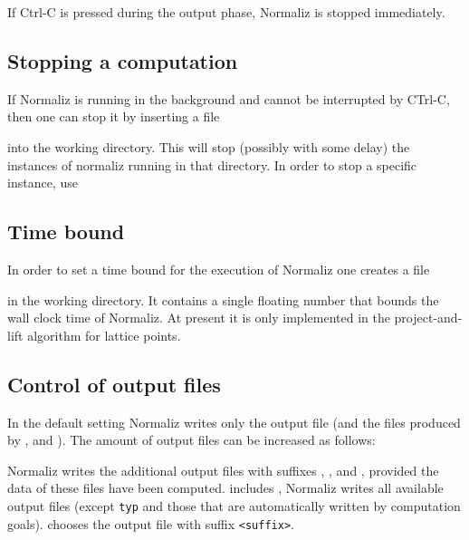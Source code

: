 If Ctrl-C is pressed during the output phase, Normaliz is stopped immediately.

\subsection{Stopping a computation}

If Normaliz is running in the background and cannot be interrupted by CTrl-C, then one can stop it by inserting a file
\begin{itemize}
\end{itemize}
into the working directory. This will stop (possibly with some delay) the instances of normaliz running in that directory. In order to stop a specific instance, use
\begin{itemize}
\end{itemize}

\subsection{Time bound}\label{time_bound}

In order to set a time bound for the execution of Normaliz one creates a file
\begin{itemize}
\end{itemize}
in the working directory. It contains a single floating number that bounds the wall clock time of Normaliz. At present it is only implemented in the project-and-lift algorithm for lattice points. 

\subsection{Control of output files}\label{outcontrol}

In the default setting Normaliz writes only the output file
 (and the files produced by ,  and ). The
amount of output files can be
increased as follows:
\begin{itemize}
	\itemtt[{-}{-}files, -f] Normaliz writes the additional output files
	with suffixes , , and ,
	provided the data of these files have been computed.
	 includes , Normaliz writes all
	available output files (except \verb|typ| and those that are automatically written by computation goals).
	\itemtt [{-}{-}<suffix>] chooses the output file with suffix \verb|<suffix>|.
\end{itemize}

